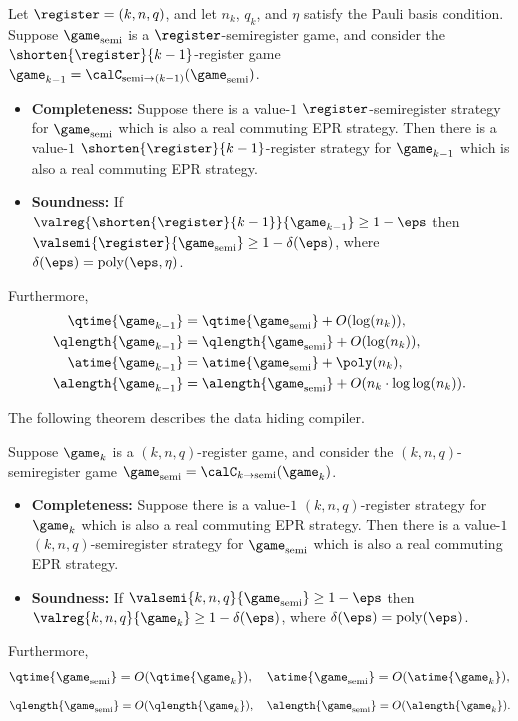 \begin{theorem}\label{theorem:semi-to-k-1-layer}
Let $\register = (k, n, q)$, and let $n_k$, $q_k$, and $\eta$ satisfy the Pauli basis condition.
Suppose $\game_{\mathrm{semi}}$ is a $\register$-semiregister game,
and consider the $\shorten{\register}{k-1}$-register game $\game_{k-1} = \calC_{\mathrm{semi} \rightarrow (k-1)}(\game_{\mathrm{semi}})$.
\begin{itemize}
\item[$\circ$] \textbf{Completeness:} Suppose there is a value-$1$ $\register$-semiregister strategy for $\game_{\mathrm{semi}}$ which is also a real commuting EPR strategy.
	Then there is a value-$1$ $\shorten{\register}{k-1}$-register strategy for $\game_{k-1}$ which is also a real commuting EPR strategy.
\item[$\circ$] \textbf{Soundness:} If $\valreg{\shorten{\register}{k-1}}{\game_{k-1}}\geq 1-\eps$ then $\valsemi{\register}{\game_{\mathrm{semi}}} \geq 1 -\delta(\eps)$, where $\delta(\eps) = \mathrm{poly}(\eps, \eta)$.
\end{itemize}
Furthermore,
\begin{align*}
\qtime{\game_{k-1}} &= \qtime{\game_{\mathrm{semi}}} + O(\log(n_k)), \\
\qlength{\game_{k-1}} &= \qlength{\game_{\mathrm{semi}}} + O(\log(n_k)),  \\
\atime{\game_{k-1}} &= \atime{\game_{\mathrm{semi}}} + \poly(n_k),\\
\alength{\game_{k-1}} &= \alength{\game_{\mathrm{semi}}} + O(n_k \cdot \log \log(n_k)).
\end{align*}
\end{theorem}

The following theorem describes the data hiding compiler.

\begin{theorem}\label{theorem:k-to-semi-layer}
Suppose $\game_k$ is a $(k, n, q)$-register game,
and consider the $(k, n, q)$-semiregister game $\game_{\mathrm{semi}} = \calC_{k \rightarrow \mathrm{semi}}(\game_k)$.
\begin{itemize}
\item[$\circ$] \textbf{Completeness:} 
	Suppose there is a value-$1$ $(k,n,q)$-register strategy for $\game_{k}$ which is also a real commuting EPR strategy.
	Then there is a value-$1$ $(k,n,q)$-semiregister strategy for $\game_{\mathrm{semi}}$ which is also a real commuting EPR strategy.
\item[$\circ$] \textbf{Soundness:} If $\valsemi{k,n,q}{\game_{\mathrm{semi}}} \geq 1-\eps$ then $\valreg{k,n,q}{\game_{k}} \geq 1 -\delta(\eps)$, where $\delta(\eps) = \mathrm{poly}(\eps)$.
\end{itemize}
Furthermore,
\begin{equation*}
\qtime{\game_{\mathrm{semi}}} = O(\qtime{\game_k}), \quad
\atime{\game_{\mathrm{semi}}} = O(\atime{\game_k}),
\end{equation*}
\begin{equation*}
\qlength{\game_{\mathrm{semi}}} = O(\qlength{\game_k}), \quad
\alength{\game_{\mathrm{semi}}} = O(\alength{\game_k}).
\end{equation*}
\end{theorem}

